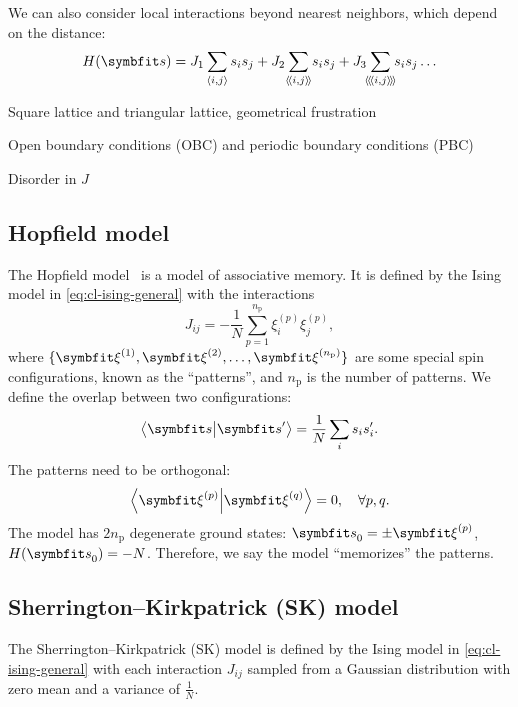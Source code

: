 We can also consider local interactions beyond nearest neighbors, which depend on the distance:
\begin{equation}
H(\vs) = J_1 \sum_{\langle i, j \rangle} s_i s_j + J_2\!\sum_{\llangle i, j \rrangle}\!s_i s_j + J_3\!\!\sum_{\langle\!\langle\!\langle i, j \rangle\!\rangle\!\rangle}\!\!s_i s_j \ldots
\label{eq:cl-ising-nnn}
\end{equation}

Square lattice and triangular lattice, geometrical frustration

Open boundary conditions (OBC) and periodic boundary conditions (PBC)

Disorder in $J$

\subsection{Hopfield model}

The Hopfield model~\cite{hopfield1982neural, amit1985spin} is a model of associative memory. It is defined by the Ising model in \cref{eq:cl-ising-general} with the interactions
\begin{equation}
J_{i j} = -\frac{1}{N} \sum_{p = 1}^{n_\text{p}} \xi^{(p)}_i \xi^{(p)}_j,
\label{eq:hopfield}
\end{equation}
where $\{\vxi^{(1)}, \vxi^{(2)}, \ldots, \vxi^{(n_\text{p})}\}$ are some special spin configurations, known as the ``patterns'', and $n_\text{p}$ is the number of patterns. We define the overlap between two configurations:
\begin{equation}
\ip{\vs}{\vs'} = \frac{1}{N} \sum_i s_i s'_i.
\label{eq:cl-overlap}
\end{equation}
The patterns need to be orthogonal:
\begin{equation}
\ip{\vxi^{(p)}}{\vxi^{(q)}} = 0, \quad \forall p, q.
\end{equation}
The model has $2 n_\text{p}$ degenerate ground states: $\vs_0 = \pm \vxi^{(p)}$, $H(\vs_0) = -N$. Therefore, we say the model ``memorizes'' the patterns.

\subsection{Sherrington--Kirkpatrick (SK) model}
\label{sec:sk}

The Sherrington--Kirkpatrick (SK) model is defined by the Ising model in \cref{eq:cl-ising-general} with each interaction $J_{i j}$ sampled from a Gaussian distribution with zero mean and a variance of $\frac{1}{N}$.

